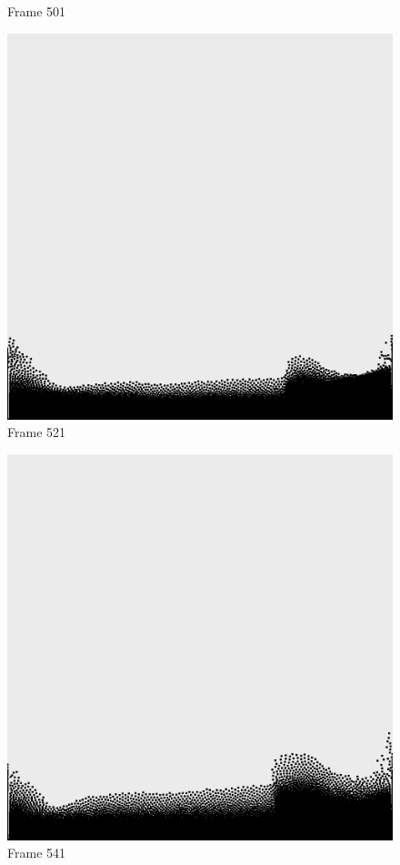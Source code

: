 \documentclass[a4paper, 12pt, oneside]{book}
\begin{document}
\begin{figure}[!ht]
\begin{center}
            Frame 501
        \end{center}
    \endminipage
    \hfill
        \begin{center}
            \includegraphics[width=\linewidth]{images/test_case_2/521.png}
            Frame 521
        \end{center}
    \endminipage
    \hfill
        \begin{center}
            \includegraphics[width=\linewidth]{images/test_case_2/541.png}
            Frame 541
        \end{center}
    \endminipage
    \hfill


\end{figure}
\end{document}
